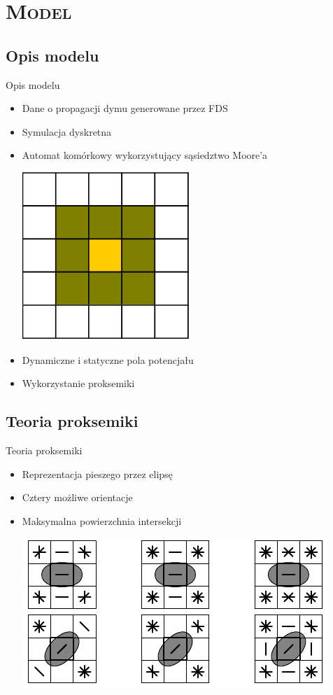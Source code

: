 \section{\scshape Model}

\subsection{Opis modelu}
\begin{frame}{Opis modelu}
	\begin{itemize}
	\item Dane o propagacji dymu generowane przez FDS
	\item Symulacja dyskretna
	\item Automat komórkowy wykorzystujący sąsiedztwo Moore'a
	\begin{center}	
	\includegraphics[keepaspectratio=true, scale=0.5]{moore}
	\end{center}
	\item Dynamiczne i statyczne pola potencjału
	\item Wykorzystanie proksemiki
	\end{itemize}
\end{frame}

\subsection{Teoria proksemiki}
\begin{frame}{Teoria proksemiki}
 \begin{itemize}
 	\item Reprezentacja pieszego przez elipsę
 	\item Cztery możliwe orientacje
 	\item Maksymalna powierzchnia intersekcji
 	\begin{center}	
	\includegraphics[keepaspectratio=true, scale = 0.5]{proxemics}
	\end{center}	
 \end{itemize}
\end{frame}

